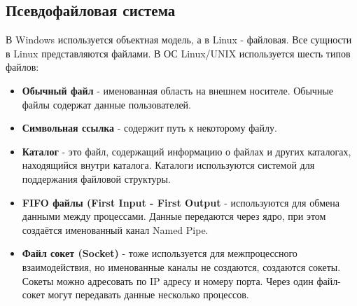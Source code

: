 \documentclass[a4paper]{article}
\begin{document}
\subsection{Псевдофайловая система}
В Windows используется объектная модель, а в Linux - файловая. Все сущности в Linux представляются файлами. В ОС Linux/UNIX используется шесть типов файлов:
\begin{itemize}
        \item \textbf{Обычный файл} - именованная область на внешнем носителе. Обычные файлы содержат данные пользователей.
	\item \textbf{Символьная ссылка} - содержит путь к некоторому файлу.
	\item \textbf{Каталог} - это файл, содержащий информацию о файлах и других каталогах, находящийся внутри каталога. Каталоги используются системой для поддержания файловой структуры.
	\item \textbf{FIFO файлы (First Input - First Output} - используются для обмена данными между процессами. Данные передаются через ядро, при этом создаётся именованный канал Named Pipe.
	\item \textbf{Файл сокет (Socket)} - тоже используется для межпроцессного взаимодействия, но именованные каналы не создаются, создаются сокеты. Сокеты можно адресовать по IP адресу и номеру порта. Через один файл-сокет могут передавать данные несколько процессов. 
\end{itemize}
\end{document}
